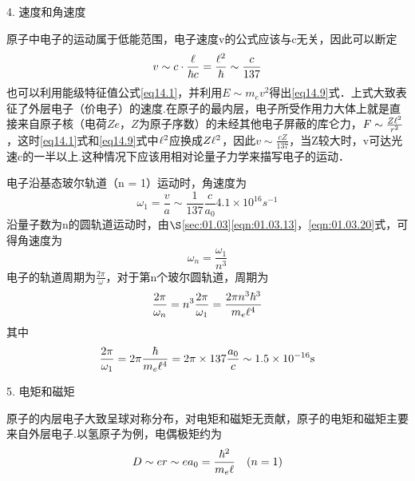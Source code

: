 \textsf{4. 速度和角速度}

原子中电子的运动属于低能范围，电子速度v的公式应该与c无关，因此可以断定
\begin{equation}\label{eq14.9}
	v\sim c \cdot\frac{\e}{\hbar c}=\frac{\e^{2}}{\hbar}\sim\frac{c}{137}
\end{equation}
也可以利用能级特征值公式\eqref{eq14.1}，并利用$E\sim m_{e}v^{2}$得出\eqref{eq14.9}式．上式大致表征了外层电子（价电子）的速度.在原子的最内层，电子所受作用力大体上就是直接来自原子核（电荷$Ze$，$Z$为原子序数）的未经其他电子屏蔽的库仑力，$F\sim\frac{Z\e^{2}}{r^{2}}$，这时\eqref{eq14.1}式和\eqref{eq14.9}式中$\e^{2}$应换成$Z\e^{2}$，因此$v\sim\frac{cZ}{137}$，当Z较大时，v可达光速c的一半以上.这种情况下应该用相对论量子力学来描写电子的运动．

电子沿基态玻尔轨道（n = 1）运动时，角速度为
\begin{equation}\label{eq14.10}
	\omega_{1}=\frac{v}{a}\sim\frac{1}{137}\frac{c}{a_{0}}4.1\times10^{16} \si{s^{-1}}
\end{equation}\eqshort
沿量子数为n的圆轨道运动时，由$\S$\ref{sec:01.03}\eqref{eqn:01.03.13}，\eqref{eqn:01.03.20}式，可得角速度为
\begin{equation}\label{eq14.11}
	\omega_{n}=\frac{\omega_{1}}{n^{3}}
\end{equation}\eqnormal
电子的轨道周期为$\frac{2\pi}{\omega}$，对于第n个玻尔圆轨道，周期为
\begin{equation}\label{eq14.12}
	\frac{2\pi}{\omega_{n}}=n^{3}\frac{2\pi}{\omega_{1}}=\frac{2\pi n^{3}\hbar^{3}}{m_{e}\e^{4}}
\end{equation}\eqlong
其中
\begin{equation}\label{eq14.13}
	\frac{2\pi}{\omega_{1}}=2\pi\frac{\hbar}{m_{e}\e^{4}}=2\pi\times137\frac{a_{0}}{c}\sim1.5\times10^{-16} \si{s}
\end{equation}\eqnormal

\textsf{5. 电矩和磁矩}

原子的内层电子大致呈球对称分布，对电矩和磁矩无贡献，原子的电矩和磁矩主要来自外层电子.以氢原子为例，电偶极矩约为
\begin{equation}\label{eq14.14}
	D\sim er\sim ea_{0}=\frac{\hbar^{2}}{m_{e}\e}\quad(n=1)
\end{equation}

